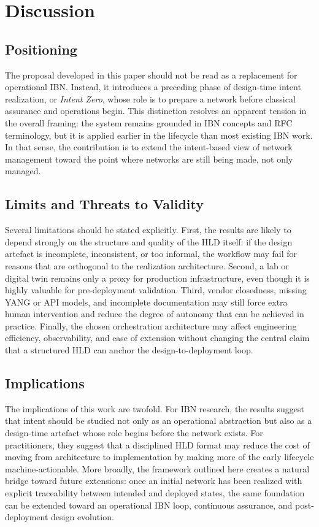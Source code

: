 \documentclass[conference]{IEEEtran}
\begin{document}
\section{Discussion}

\subsection{Positioning}

The proposal developed in this paper should not be read as a replacement for operational IBN. Instead, it introduces a preceding phase of design-time intent realization, or \emph{Intent Zero}, whose role is to prepare a network before classical assurance and operations begin. This distinction resolves an apparent tension in the overall framing: the system remains grounded in IBN concepts and RFC terminology, but it is applied earlier in the lifecycle than most existing IBN work. In that sense, the contribution is to extend the intent-based view of network management toward the point where networks are still being made, not only managed.

\subsection{Limits and Threats to Validity}

Several limitations should be stated explicitly. First, the results are likely to depend strongly on the structure and quality of the HLD itself: if the design artefact is incomplete, inconsistent, or too informal, the workflow may fail for reasons that are orthogonal to the realization architecture. Second, a lab or digital twin remains only a proxy for production infrastructure, even though it is highly valuable for pre-deployment validation. Third, vendor closedness, missing YANG or API models, and incomplete documentation may still force extra human intervention and reduce the degree of autonomy that can be achieved in practice. Finally, the chosen orchestration architecture may affect engineering efficiency, observability, and ease of extension without changing the central claim that a structured HLD can anchor the design-to-deployment loop.

\subsection{Implications}

The implications of this work are twofold. For IBN research, the results suggest that intent should be studied not only as an operational abstraction but also as a design-time artefact whose role begins before the network exists. For practitioners, they suggest that a disciplined HLD format may reduce the cost of moving from architecture to implementation by making more of the early lifecycle machine-actionable. More broadly, the framework outlined here creates a natural bridge toward future extensions: once an initial network has been realized with explicit traceability between intended and deployed states, the same foundation can be extended toward an operational IBN loop, continuous assurance, and post-deployment design evolution.
\end{document}
